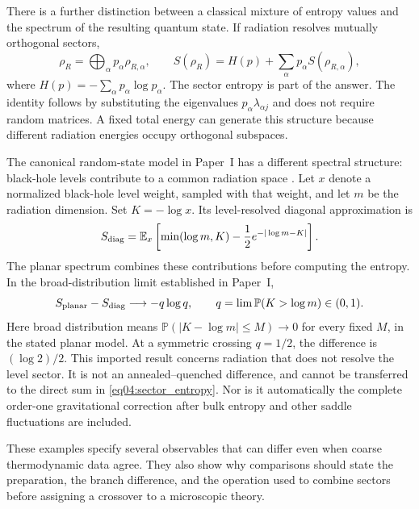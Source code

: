 \documentclass[11pt,letterpaper]{article}
\theoremstyle{plain}
\theoremstyle{definition}
\theoremstyle{remark}
\newcommand{\E}{\mathbb{E}}
\newcommand{\Prob}{\mathbb{P}}
\begin{document}
There is a further distinction between a classical mixture of entropy
values and the spectrum of the resulting quantum state. If radiation
resolves mutually orthogonal sectors,
\begin{equation}
 \rho_R=\bigoplus_\alpha p_\alpha\rho_{R,\alpha},\qquad
 S(\rho_R)=H(p)+\sum_\alpha p_\alpha S(\rho_{R,\alpha}),
 \label{eq04:sector_entropy}
\end{equation}
where $H(p)=-\sum_\alpha p_\alpha\log p_\alpha$.
The sector entropy is part of the answer. The identity follows by
substituting the eigenvalues $p_\alpha\lambda_{\alpha j}$ and does not
require random matrices. A fixed total energy can generate this
structure because different radiation energies occupy orthogonal
subspaces.

The canonical random-state model in Paper~I has a different spectral
structure: black-hole levels contribute to a common radiation space
\cite{pssyetal2022,wang2023,wuebben2026a}. Let $x$ denote a normalized
black-hole level weight, sampled with that weight, and let $m$ be the
radiation dimension. Set $K=-\log x$. Its level-resolved diagonal
approximation is
\begin{equation}
 S_{\rm diag}=\E_x\left[
 \min(\log m,K)-\frac12e^{-|\log m-K|}\right].
 \label{eq04:diagonal}
\end{equation}
The planar spectrum combines these contributions before computing the
entropy. In the broad-distribution limit established in Paper~I,
\begin{equation}
 S_{\rm planar}-S_{\rm diag}\longrightarrow-q\log q,
 \qquad q=\lim\Prob(K>\log m)\in(0,1).
 \label{eq04:spreading}
\end{equation}
Here broad distribution means
$\Prob(|K-\log m|\leq M)\to0$ for every fixed $M$, in the stated
planar model. At a symmetric crossing $q=1/2$, the difference is
$(\log2)/2$. This imported result concerns radiation that does not
resolve the level sector. It is not an annealed--quenched difference,
and cannot be transferred to the direct sum in
\eqref{eq04:sector_entropy}. Nor is it automatically the complete
order-one gravitational correction after bulk entropy and other
saddle fluctuations are included.

These examples specify several observables that can differ even when
coarse thermodynamic data agree. They also show why comparisons should
state the preparation, the branch difference, and the operation used
to combine sectors before assigning a crossover to a microscopic theory.
\end{document}
